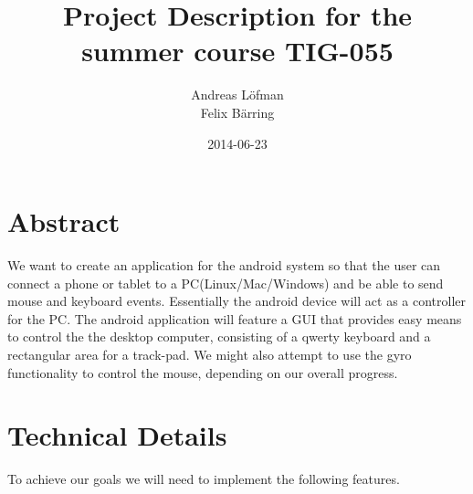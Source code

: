 \documentclass[11pt]{article}
\title{\textbf{Project Description for the summer course TIG-055}}
\author{Andreas Löfman\\
				Felix Bärring\\}
\date{2014-06-23}
\begin{document}
\maketitle

\section*{Abstract}

We want to create an application for the android system so that the user can connect a phone or tablet to a PC(Linux/Mac/Windows) and be able to send mouse and keyboard events. Essentially the android device will act as a controller for the PC. The android application will feature a GUI that provides easy means to control the the desktop computer, consisting of a qwerty keyboard and a rectangular area for a track-pad. We might also attempt to use the gyro functionality to control the mouse, depending on our overall progress.

\section*{Technical Details} 

To achieve our goals we will need to implement the following features.
\end{document}
